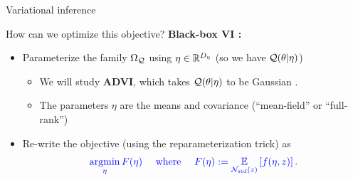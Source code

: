 \documentclass[8pt]{beamer}\usepackage[]{graphicx}\usepackage[]{color}
\begin{document}
\begin{frame}[t]{Variational inference \citep{blei:2016:variational}}



How can we optimize this objective?
\pause
\textbf{Black-box VI \citep{ranganath:2014:bbvi}: }
%
\begin{itemize}
    \item Parameterize the family $\Omega_{\mathcal{Q}}$ using $\eta \in \mathbb{R}^{{D_{\eta}}}$ (so we have $\mathcal{Q}(\theta \vert \eta)$)
    \begin{itemize}
        \item We will study \textbf{ADVI}, which takes $\mathcal{Q}(\theta \vert \eta)$
        to be Gaussian
        \citep{kucukelbir:2017:advi}.
        \item The parameters $\eta$ are the means and covariance (``mean-field'' or ``full-rank'')
    \end{itemize}
    \item Re-write the objective (using the reparameterization trick) as 
    \begin{align*}
        \textcolor{blue}{
        \operatorname*{\mathrm{argmin}}_{\eta} F(\eta)
        \quad\text{ where }\quad F(\eta) := \underset{\mathcal{N}_{\mathrm{std}}\left(z\right)}{\mathbb{E}}\left[f(\eta, z)\right].
        }
    \end{align*}
\end{itemize}


\end{frame}
\end{document}
